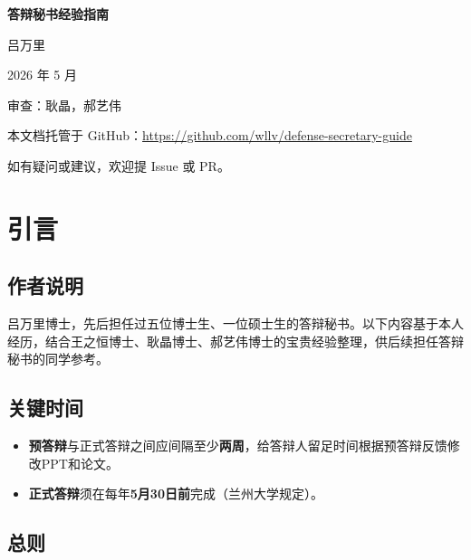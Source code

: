 \documentclass[12pt,a4paper,openany]{ctexbook}
\begin{document}
\thispagestyle{empty}
\begin{center}
\vspace*{3cm}

{\Huge\bfseries\color{lzublue}答辩秘书经验指南}

\vspace{1.5cm}

{\Large 吕万里}

\vspace{0.5cm}

{\Large 2026 年 5 月}

\vspace{1cm}

{\large 审查：耿晶，郝艺伟}

\vspace{2cm}

\large
本文档托管于 GitHub：\url{https://github.com/wllv/defense-secretary-guide}

如有疑问或建议，欢迎提 Issue 或 PR。
\end{center}
\newpage

\tableofcontents
\newpage

\chapter{引言}

\section{作者说明}

吕万里博士，先后担任过五位博士生、一位硕士生的答辩秘书。以下内容基于本人经历，结合王之恒博士、耿晶博士、郝艺伟博士的宝贵经验整理，供后续担任答辩秘书的同学参考。

\section{关键时间}

\begin{itemize}
  \item \textbf{预答辩}与正式答辩之间应间隔至少\textbf{两周}，给答辩人留足时间根据预答辩反馈修改PPT和论文。
  \item \textbf{正式答辩}须在每年\textbf{5月30日前}完成（兰州大学规定）。
\end{itemize}

\section{总则}
\end{document}
